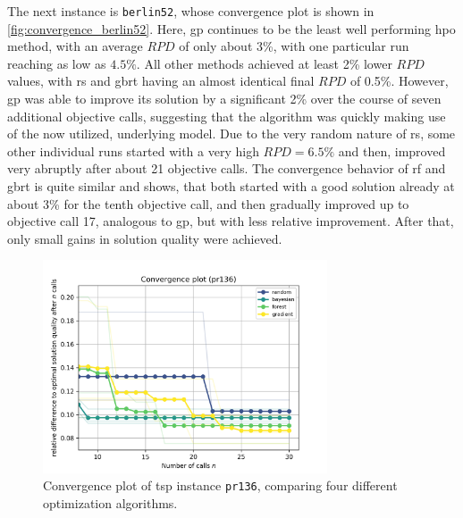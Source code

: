 The next instance is \texttt{berlin52}, whose convergence plot is shown in \cref{fig:convergence_berlin52}. Here, \gls{gp} continues to be the least well performing \gls{hpo} method, with an average $RPD$ of only about 3\%, with one particular run reaching as low as $4.5\%$. All other methods achieved at least 2\% lower $RPD$ values, with \gls{rs} and \gls{gbrt} having an almost identical final $RPD$ of 0.5\%. 
However, \gls{gp} was able to improve its solution by a significant 2\% over the course of seven additional objective calls, suggesting that the algorithm was quickly making use of the now utilized, underlying model.
Due to the very random nature of \gls{rs}, some other individual runs started with a very high $RPD = 6.5\%$ and then, improved very abruptly after about 21 objective calls. The convergence behavior of \gls{rf} and \gls{gbrt} is quite similar and shows, that both started with a good solution already at about 3\% for the tenth objective call, and then gradually improved up to objective call 17, analogous to \gls{gp}, but with less relative improvement. After that, only small gains in solution quality were achieved.

\begin{figure}[h]
	\centering
	\includegraphics[width=0.75\textwidth]{results/part1/convergence_pr136.png}
	\caption[Convergence plot of \gls{tsp} instance \texttt{pr136}]{Convergence plot of \gls{tsp} instance \texttt{pr136}, comparing four different optimization algorithms.}
	\label{fig:convergence_pr136}
\end{figure}

